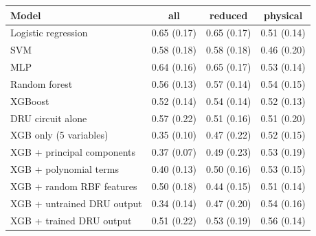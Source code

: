 \begin{tabular}{lccc}
\toprule
Model & all & reduced & physical \\
\midrule
Logistic regression & 0.65 (0.17) & 0.65 (0.17) & 0.51 (0.14) \\
SVM & 0.58 (0.18) & 0.58 (0.18) & 0.46 (0.20) \\
MLP & 0.64 (0.16) & 0.65 (0.17) & 0.53 (0.14) \\
Random forest & 0.56 (0.13) & 0.57 (0.14) & 0.54 (0.15) \\
XGBoost & 0.52 (0.14) & 0.54 (0.14) & 0.52 (0.13) \\
DRU circuit alone & 0.57 (0.22) & 0.51 (0.16) & 0.51 (0.20) \\
XGB only (5 variables) & 0.35 (0.10) & 0.47 (0.22) & 0.52 (0.15) \\
XGB + principal components & 0.37 (0.07) & 0.49 (0.23) & 0.53 (0.19) \\
XGB + polynomial terms & 0.40 (0.13) & 0.50 (0.16) & 0.53 (0.15) \\
XGB + random RBF features & 0.50 (0.18) & 0.44 (0.15) & 0.51 (0.14) \\
XGB + untrained DRU output & 0.34 (0.14) & 0.47 (0.20) & 0.54 (0.16) \\
XGB + trained DRU output & 0.51 (0.22) & 0.53 (0.19) & 0.56 (0.14) \\
\bottomrule
\end{tabular}
